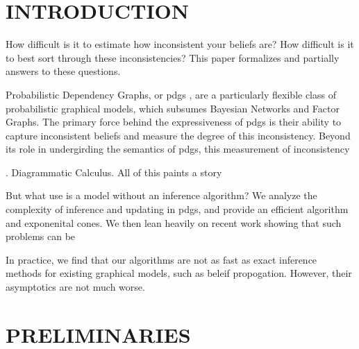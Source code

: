 \documentclass[twoside]{article}
\begin{document}
% 




\section{INTRODUCTION}

How difficult is it to estimate how inconsistent your beliefs are?
How difficult is it to best sort through these inconsistencies? 
This paper formalizes and partially answers to these questions.

Probabilistic Dependency Graphs, or pdgs \parencite{pdg-aaai},
are a particularly flexible class of probabilistic graphical models, which subsumes Bayesian Networks and Factor Graphs.
The primary force behind the expressiveness of pdgs is their ability to capture inconsistent beliefs and measure the degree of this inconsistency.
%
Beyond its role in undergirding the semantics of pdgs, 
this measurement of inconsistency  


 \parencite{one-true-loss}.
Diagrammatic Calculus.
All of this paints a story 

But what use is a model without an inference algorithm? 
We analyze the complexity of inference and updating in pdgs, and 
provide an efficient algorithm and exponenital cones.
We then lean heavily on recent work 
\parencite{dahl2022primal} showing that 
such problems can be 

In practice, we find that our algorithms are not as fast as exact inference methods for existing graphical models, such as beleif propogation.   
However, their asymptotics are not much worse.

\section{PRELIMINARIES}
\end{document}
